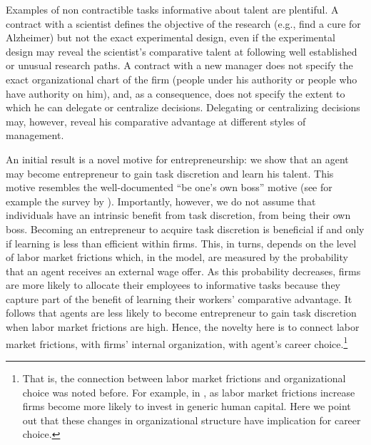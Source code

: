 \documentclass[12pt,american]{paper}
\theoremstyle{remark}
\begin{document}
Examples of non contractible tasks informative about talent are plentiful. A contract with a scientist defines the objective of the research (e.g., find a cure for Alzheimer) but not the exact experimental design, even if the experimental design may reveal the scientist's comparative talent at following well established or unusual research paths. A contract with a new manager does not specify the exact organizational chart of the firm (people under his authority or people who have authority on him), and, as a consequence, does not specify the extent to which he can delegate or centralize decisions. Delegating or centralizing decisions may, however, reveal his comparative advantage at different styles of management.

An initial result is a novel motive for entrepreneurship: we show that an agent may become entrepreneur to gain task discretion and learn his talent. This motive resembles the  well-documented ``be one's own boss'' motive  (see for example the survey by \citealp{stephan2015understanding}). Importantly, however, we do not assume that individuals have an intrinsic benefit from task discretion, from being their own boss. Becoming an entrepreneur to acquire task discretion is beneficial if and only if learning is less than efficient within firms. This, in turns, depends on the level of labor market frictions which, in the model, are measured by the  probability that an agent receives an external wage offer. As this probability decreases, firms are more likely to allocate their  employees to informative tasks because they capture part of the benefit of learning their workers' comparative advantage.%
It follows that agents are less likely to become entrepreneur to gain task discretion when labor market frictions are high. {\color{blue}Hence, the novelty here is to connect labor market frictions, with firms' internal organization, with agent's career choice.\footnote{That is, the connection between labor market frictions and organizational choice was noted before. For example, in \cite{acemoglu1999structure}, as labor market frictions increase firms become more likely to invest in generic human capital. Here we point out that these changes in organizational structure have implication for career choice.}}
\end{document}
